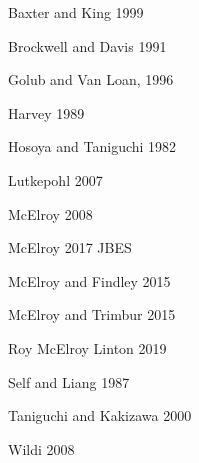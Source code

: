 \documentclass[a4paper]{book}
\begin{document}
\begin{thebibliography}{}

\bibitem{} Baxter and King 1999

\bibitem{}  Brockwell and Davis 1991

\bibitem{} Golub and Van Loan, 1996

\bibitem{} Harvey 1989

\bibitem{} Hosoya and Taniguchi 1982

\bibitem{}  Lutkepohl 2007

\bibitem{} McElroy 2008

\bibitem{} McElroy 2017 JBES

\bibitem{} McElroy and Findley 2015

\bibitem{} McElroy and Trimbur 2015

\bibitem{} Roy McElroy Linton 2019

\bibitem{} Self and Liang 1987

\bibitem{} Taniguchi and Kakizawa 2000

\bibitem{} Wildi 2008




\end{thebibliography}
\end{document}
